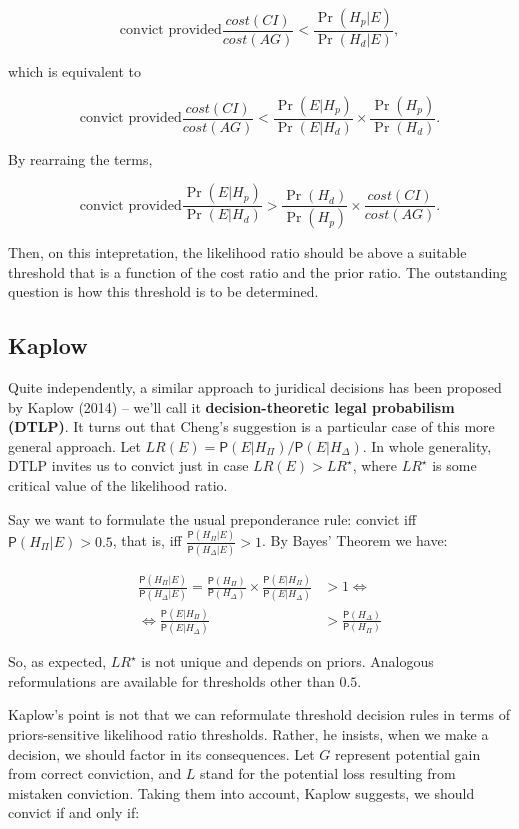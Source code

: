 \documentclass[10pt,dvipsnames,enabledeprecatedfontcommands]{scrartcl}
\newcommand{\pr}[1]{\mathsf{P}(#1)}
\begin{document}
\[ \text{convict provided}           \frac{cost(CI)}{cost(AG)} < \frac{\Pr(H_p | E)}{\Pr(H_d | E )}, \]

which is equivalent to

\[ \text{convict provided}           \frac{cost(CI)}{cost(AG)} < \frac{\Pr(E | H_p)}{\Pr(E | H_d)} \times \frac{\Pr(H_p)}{\Pr(H_d)}.\]

By rearraing the terms,

\[ \text{convict provided}  \frac{\Pr(E | H_p)}{\Pr(E | H_d)} > \frac{\Pr(H_d)}{\Pr(H_p)} \times     \frac{cost(CI)}{cost(AG)} .\]

Then, on this intepretation, the likelihood ratio should be above a
suitable threshold that is a function of the cost ratio and the prior
ratio. The outstanding question is how this threshold is to be
determined.

\subsection{Kaplow}\label{kaplow}

Quite independently, a similar approach to juridical decisions has been
proposed by Kaplow (2014) -- we'll call it
\textbf{decision-theoretic legal probabilism (DTLP)}. It turns out that
Cheng's suggestion is a particular case of this more general approach.
Let \(LR(E)=\pr{E\vert H_\Pi}/\pr{E\vert H_\Delta}\). In whole
generality, DTLP invites us to convict just in case \(LR(E)>LR^\star\),
where \(LR^\star\) is some critical value of the likelihood ratio.

Say we want to formulate the usual preponderance rule: convict iff
\(\pr{H_\Pi\vert E}>0.5\), that is, iff
\(\frac{\pr{H_\Pi\vert E}}{\pr{H_\Delta\vert E}}>1\). By Bayes' Theorem
we have:

\vspace{-6mm}

\begin{align*}
\frac{\pr{H_\Pi\vert E}}{\pr{H_\Delta\vert E}} =  \frac{\pr{H_\Pi}}{\pr{H_\Delta}}\times \frac{\pr{E\vert H_\Pi}}{\pr{E\vert H_\Delta}} &>1 \Leftrightarrow\\
  \Leftrightarrow \frac{\pr{E\vert H_\Pi}}{\pr{E\vert H_\Delta}} &> \frac{\pr{H_\Delta}}{\pr{H_\Pi}} 
 \end{align*}

\noindent So, as expected, \(LR^\star\) is not unique and depends on
priors. Analogous reformulations are available for thresholds other than
\(0.5\).

Kaplow's point is not that we can reformulate threshold decision rules
in terms of priors-sensitive likelihood ratio thresholds. Rather, he
insists, when we make a decision, we should factor in its consequences.
Let \(G\) represent potential gain from correct conviction, and \(L\)
stand for the potential loss resulting from mistaken conviction. Taking
them into account, Kaplow suggests, we should convict if and only if:
\end{document}
